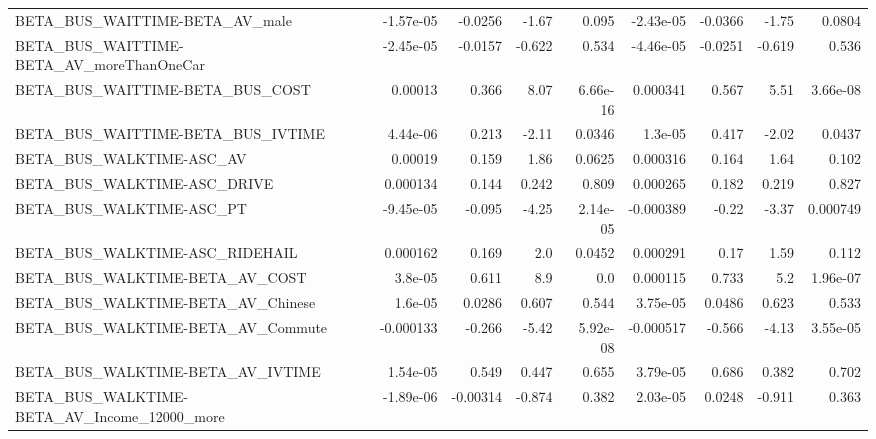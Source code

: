 \begin{tabular}{lrrrrrrrr}
BETA\_BUS\_WAITTIME-BETA\_AV\_male                     &   -1.57e-05 &      -0.0256 &    -1.67 &    0.095 &  -2.43e-05 &     -0.0366 &        -1.75 &        0.0804 \\
BETA\_BUS\_WAITTIME-BETA\_AV\_moreThanOneCar           &   -2.45e-05 &      -0.0157 &   -0.622 &    0.534 &  -4.46e-05 &     -0.0251 &       -0.619 &         0.536 \\
BETA\_BUS\_WAITTIME-BETA\_BUS\_COST                    &     0.00013 &        0.366 &     8.07 & 6.66e-16 &   0.000341 &       0.567 &         5.51 &      3.66e-08 \\
BETA\_BUS\_WAITTIME-BETA\_BUS\_IVTIME                  &    4.44e-06 &        0.213 &    -2.11 &   0.0346 &    1.3e-05 &       0.417 &        -2.02 &        0.0437 \\
BETA\_BUS\_WALKTIME-ASC\_AV                           &     0.00019 &        0.159 &     1.86 &   0.0625 &   0.000316 &       0.164 &         1.64 &         0.102 \\
BETA\_BUS\_WALKTIME-ASC\_DRIVE                        &    0.000134 &        0.144 &    0.242 &    0.809 &   0.000265 &       0.182 &        0.219 &         0.827 \\
BETA\_BUS\_WALKTIME-ASC\_PT                           &   -9.45e-05 &       -0.095 &    -4.25 & 2.14e-05 &  -0.000389 &       -0.22 &        -3.37 &      0.000749 \\
BETA\_BUS\_WALKTIME-ASC\_RIDEHAIL                     &    0.000162 &        0.169 &      2.0 &   0.0452 &   0.000291 &        0.17 &         1.59 &         0.112 \\
BETA\_BUS\_WALKTIME-BETA\_AV\_COST                     &     3.8e-05 &        0.611 &      8.9 &      0.0 &   0.000115 &       0.733 &          5.2 &      1.96e-07 \\
BETA\_BUS\_WALKTIME-BETA\_AV\_Chinese                  &     1.6e-05 &       0.0286 &    0.607 &    0.544 &   3.75e-05 &      0.0486 &        0.623 &         0.533 \\
BETA\_BUS\_WALKTIME-BETA\_AV\_Commute                  &   -0.000133 &       -0.266 &    -5.42 & 5.92e-08 &  -0.000517 &      -0.566 &        -4.13 &      3.55e-05 \\
BETA\_BUS\_WALKTIME-BETA\_AV\_IVTIME                   &    1.54e-05 &        0.549 &    0.447 &    0.655 &   3.79e-05 &       0.686 &        0.382 &         0.702 \\
BETA\_BUS\_WALKTIME-BETA\_AV\_Income\_12000\_more        &   -1.89e-06 &     -0.00314 &   -0.874 &    0.382 &   2.03e-05 &      0.0248 &       -0.911 &         0.363 \\

\end{tabular}
